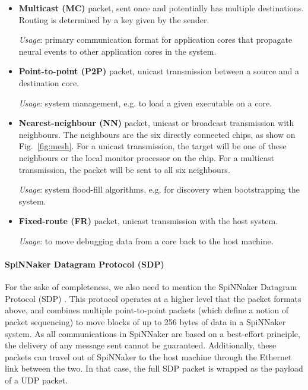 \begin{itemize}
\item \textbf{Multicast (MC)} packet, sent once and potentially has multiple destinations. Routing is determined by a key given by the sender. 

\textit{Usage}: primary communication format for application cores that propagate neural events to other application cores in the system.

\item \textbf{Point-to-point (P2P)} packet, unicast transmission between a source and a destination core. 

\textit{Usage}: system management, e.g. to load a given executable on a core.

\item \textbf{Nearest-neighbour (NN)} packet, unicast or broadcast transmission with  neighbours. The neighbours are the six directly connected chips, as show on Fig.~\ref{fig:mesh}. For a unicast transmission, the target will be one of these neighbours or the local monitor processor on the chip. For a multicast transmission, the packet will be sent to all six neighbours.

\textit{Usage}: system flood-fill algorithms, e.g. for discovery when bootstrapping the system.

\item \textbf{Fixed-route (FR)} packet, unicast transmission with the host system.

\textit{Usage}: to move debugging data from a core back to the host machine.

\end{itemize}


\paragraph{SpiNNaker Datagram Protocol (SDP)}

For the sake of completeness, we also need to mention the SpiNNaker Datagram Protocol (SDP) \cite{sdp}. This protocol operates at a higher level that the packet formats above, and combines multiple point-to-point packets (which define a notion of packet sequencing) to move blocks of up to 256 bytes of data in a SpiNNaker system. As all communications in SpiNNaker are based on a best-effort principle, the delivery of any message sent cannot be guaranteed. Additionally, these packets can travel out of SpiNNaker to the host machine through the Ethernet link between the two. In that case, the full SDP packet is wrapped as the payload of a UDP packet. \\

